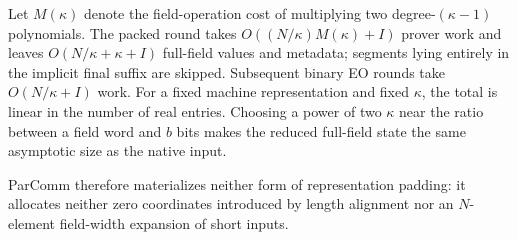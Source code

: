 Let $M(\kappa)$ denote the field-operation cost of multiplying two
degree-$(\kappa-1)$ polynomials.  The packed round takes
$O((N/\kappa)M(\kappa)+I)$ prover work and leaves
$O(N/\kappa+\kappa+I)$ full-field values and metadata; segments lying entirely
in the implicit final suffix are skipped.
Subsequent binary EO rounds take $O(N/\kappa+I)$ work.  For a fixed machine
representation and fixed $\kappa$, the total is linear in the number of real
entries.  Choosing a power of two $\kappa$ near the ratio between a field word
and $b$ bits makes the reduced full-field state the same asymptotic size as the
native input.

ParComm therefore materializes neither form of representation padding: it
allocates neither zero coordinates introduced by length alignment nor an
$N$-element field-width expansion of short inputs.
